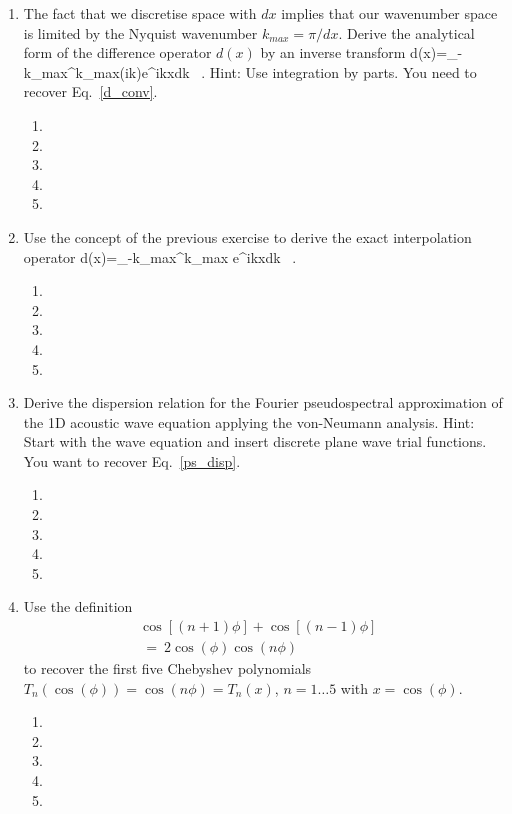 \begin{enumerate}
\begin{enumerate}
\item[]
\item[] 
\end{enumerate}
\item 
The fact that we discretise space with $dx$ implies that our wavenumber space is limited by the Nyquist wavenumber $k_{max}=\pi/dx$. Derive the analytical form of the difference operator $d(x)$ by an inverse transform
\be
d(x)=\int_{-k_{max}}^{k_{max}}(ik)e^{ikx}dk \ . 
\nonumber
\ee
Hint: Use integration by parts. You need to recover Eq.~\ref{d_conv}. 
\begin{enumerate}
\item[]
\item[]
\item[] 
\item[]
\item[] 
\end{enumerate}
\item 
Use the concept of the previous exercise to derive the exact interpolation operator
\be
d(x)=\int_{-k_{max}}^{k_{max}} e^{ikx}dk \ . 
\nonumber
\ee
\begin{enumerate}
\item[]
\item[]
\item[] 
\item[]
\item[] 
\end{enumerate}
\item
Derive the dispersion relation for the Fourier pseudospectral approximation of the 1D acoustic wave equation applying the von-Neumann analysis. Hint: Start with the wave equation and insert discrete plane wave trial functions. You want to recover Eq.~\ref{ps_disp}.
\begin{enumerate}
\item[]
\item[]
\item[] 
\item[]
\item[] 
\end{enumerate}
\item
Use the definition 
\begin{equation}
\begin{split}
\cos \left[ (n+1) \phi \right] + \cos \left[ (n-1) \phi \right] & \\
	  \ = \ 2 \cos (\phi) \cos (n\phi)   & 
\end{split}
\end{equation}
to recover the first five Chebyshev polynomials $T_n(\cos(\phi))=\cos(n\phi)=T_n(x)$, $n=1\ldots5$ with $x=\cos(\phi)$.  
\begin{enumerate}
\item[]
\item[]
\item[] 
\item[]
\item[] 
\end{enumerate}
\end{enumerate}

